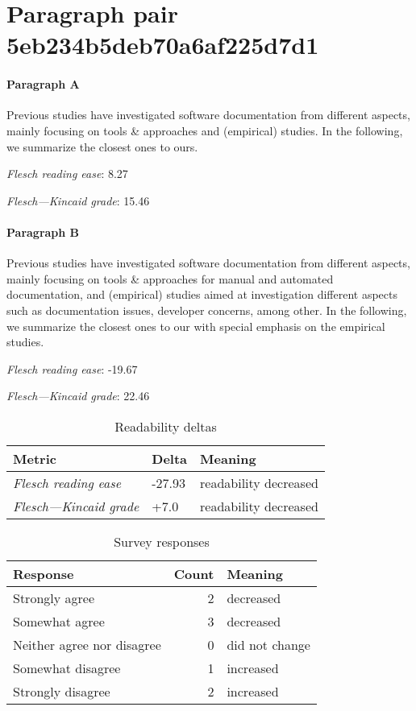 \newpage
\section{Paragraph pair 5eb234b5deb70a6af225d7d1}
\paragraph{Paragraph A}
Previous studies have investigated software documentation from different aspects, mainly focusing on tools \& approaches and (empirical) studies. In the following, we summarize the closest ones to ours.\par\medskip
\emph{Flesch reading ease}: 8.27\par
\emph{Flesch---Kincaid grade}: 15.46

\paragraph{Paragraph B}
Previous studies have investigated software documentation from different aspects, mainly focusing on tools \& approaches for manual and automated documentation, and (empirical) studies aimed at investigation different aspects such as documentation issues, developer concerns, among other. In the following, we summarize the closest ones to our with special emphasis on the empirical studies.\par\medskip
\emph{Flesch reading ease}: -19.67\par
\emph{Flesch---Kincaid grade}: 22.46

\bigskip\begin{table}[!h]
\centering
\begin{tabular}{lll}
\toprule
               \textbf{Metric} & \textbf{Delta} &       \textbf{Meaning} \\
\midrule
    \emph{Flesch reading ease} &         -27.93 &  readability decreased \\
 \emph{Flesch---Kincaid grade} &           +7.0 &  readability decreased \\
\bottomrule
\end{tabular}
\caption*{Readability deltas}\end{table}

\begin{table}[!h]
\centering
\begin{tabular}{lrl}
\toprule
          \textbf{Response} &  \textbf{Count} & \textbf{Meaning} \\
\midrule
             Strongly agree &               2 &        decreased \\
             Somewhat agree &               3 &        decreased \\
 Neither agree nor disagree &               0 &   did not change \\
          Somewhat disagree &               1 &        increased \\
          Strongly disagree &               2 &        increased \\
\bottomrule
\end{tabular}
\caption*{Survey responses}\end{table}


